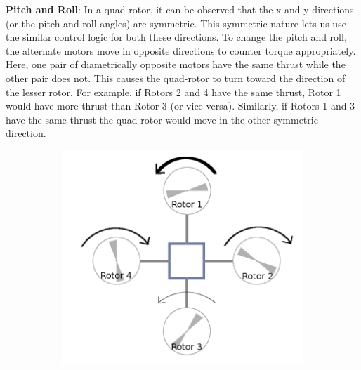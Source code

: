 \documentclass[hidelinks,BTech]{iitmdiss}
\begin{document}
{\bf Pitch and Roll}: In a quad-rotor, it can be observed that the x and y directions (or the pitch and roll angles) are symmetric. This symmetric nature lets us use the similar control logic for both these directions. To change the pitch and roll, the alternate motors move in opposite directions to counter torque appropriately. Here, one pair of diametrically opposite motors have the same thrust while the other pair does not. This causes the quad-rotor to turn toward the direction of the lesser rotor. For example, if Rotors 2 and 4 have the same thrust, Rotor 1 would have more thrust than Rotor 3 (or vice-versa). Similarly, if Rotors 1 and 3 have the same thrust the quad-rotor would move in the other symmetric direction.

\begin{figure}[H]
  \centering
    \begin{subfigure}[c]{0.45\textwidth}
      \centering
        \includegraphics[width=\textwidth]{quadrotor_rotors_roll.png}
        \caption{}
    \end{subfigure}
    \begin{subfigure}[c]{0.45\textwidth}
      \centering

\end{subfigure}
\end{figure}
\end{document}
